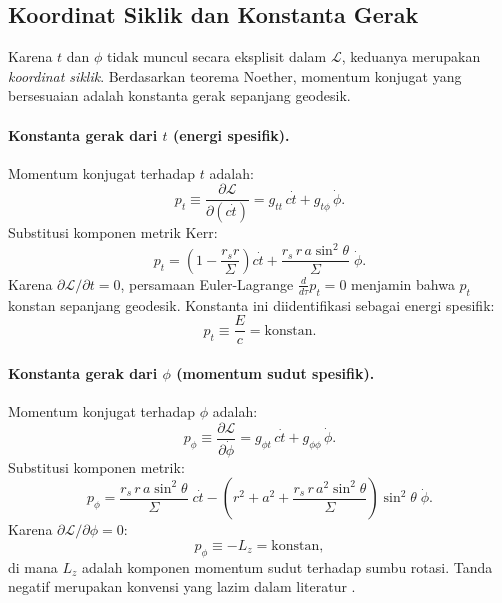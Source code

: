 \subsection{Koordinat Siklik dan Konstanta Gerak}
\label{subsec:konstanta-gerak}

Karena $t$ dan $\phi$ tidak muncul secara eksplisit dalam $\mathcal{L}$,
keduanya merupakan \textit{koordinat siklik}.
Berdasarkan teorema Noether, momentum konjugat
yang bersesuaian adalah konstanta gerak sepanjang geodesik.

\paragraph{Konstanta gerak dari $t$ (energi spesifik).}
Momentum konjugat terhadap $t$ adalah:
\begin{equation}
    p_t \equiv \frac{\partial\mathcal{L}}{\partial(c\dot{t})}
    = g_{tt}\,c\dot{t} + g_{t\phi}\,\dot{\phi}.
    \label{eq:pt-def}
\end{equation}
Substitusi komponen metrik Kerr:
\begin{equation}
    p_t = \left(1 - \frac{r_s r}{\Sigma}\right) c\dot{t}
        + \frac{r_s\, r\, a\sin^2\!\theta}{\Sigma}\;\dot{\phi}.
    \label{eq:pt-explicit}
\end{equation}
Karena $\partial\mathcal{L}/\partial t = 0$,
persamaan Euler-Lagrange $\frac{d}{d\tau}p_t = 0$ menjamin
bahwa $p_t$ konstan sepanjang geodesik.
Konstanta ini diidentifikasi sebagai energi spesifik:
\begin{equation}
    \boxed{p_t \equiv \frac{E}{c} = \text{konstan}.}
    \label{eq:energy-const}
\end{equation}

\paragraph{Konstanta gerak dari $\phi$ (momentum sudut spesifik).}
Momentum konjugat terhadap $\phi$ adalah:
\begin{equation}
    p_\phi \equiv \frac{\partial\mathcal{L}}{\partial\dot{\phi}}
    = g_{\phi t}\,c\dot{t} + g_{\phi\phi}\,\dot{\phi}.
    \label{eq:pphi-def}
\end{equation}
Substitusi komponen metrik:
\begin{equation}
    p_\phi = \frac{r_s\, r\, a\sin^2\!\theta}{\Sigma}\;c\dot{t}
           - \left(r^2 + a^2
             + \frac{r_s\, r\, a^2\sin^2\!\theta}{\Sigma}\right)\sin^2\!\theta\;\dot{\phi}.
    \label{eq:pphi-explicit}
\end{equation}
Karena $\partial\mathcal{L}/\partial\phi = 0$:
\begin{equation}
    \boxed{p_\phi \equiv -L_z = \text{konstan},}
    \label{eq:Lz-const}
\end{equation}
di mana $L_z$ adalah komponen momentum sudut terhadap sumbu rotasi.
Tanda negatif merupakan konvensi yang lazim dalam literatur \parencite{Carroll2004SpacetimeGeometry}.


